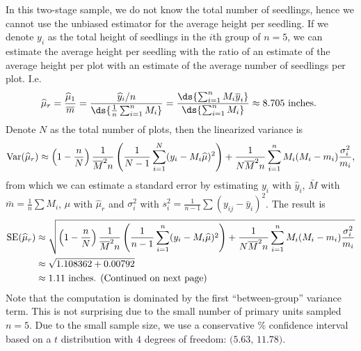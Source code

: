 \documentclass[usenames,dvipsnames]{homework}
\begin{document}
\begin{solution}
  In this two-stage sample, we do not know the total number of seedlings, hence
  we cannot use the unbiased estimator for the average height per seedling.  
  If we denote $y_i$ as the total height of seedlings in the $i$th group of $n=5$, 
  we can estimate the average height per seedling with the ratio of an estimate of the average height per plot with an estimate of 
  the average number of seedlings per plot. I.e. 
  $$
    \hat\mu_r = \frac{\hat\mu_1}{\bar m} = \frac{\hat y_i/n}{\ds{\frac 1n\sum_{i=1}^n M_i }} = \frac{\ds{\sum_{i=1}^n M_i\bar y_i }}{\ds{\sum_{i=1}^n M_i }} \approx 8.705\text{ inches. }
  $$
  Denote $N$ as the total number of plots, then the linearized variance is
  $$
    \mathrm{Var}(\widehat\mu_r) \approx \left(1-\frac nN\right) \frac 1{\overline M^2n} \left(\frac 1{N-1} \sum_{i=1}^N(y_i - M_i\widehat\mu)^2\right) + \frac{1}{N\overline M^2n} \sum_{i=1}^n M_i (M_i - m_i) \frac{\sigma_i^2}{m_i},
  $$
  from which we can estimate a standard error by estimating $y_i$ with $\hat y_i$, $\bar M$ with $\bar m = \frac 1n\sum M_i$, $\mu$ with $\hat\mu_r$ and $\sigma_i^2$ with $s_i^2 = \frac{1}{n-1}\sum (y_{ij} - \bar y_i)^2$. The result is
  \begin{align*}
    \mathrm{SE}(\widehat\mu_r) 
    &\approx \sqrt{\left(1-\frac nN\right) \frac 1{\overline M^2n} \left(\frac 1{n-1} \sum_{i=1}^n(y_i - M_i\widehat\mu)^2\right) + \frac{1}{N\overline M^2n} \sum_{i=1}^n M_i (M_i - m_i) \frac{\sigma_i^2}{m_i}} \\
     &\approx \sqrt{1.108362 + 0.00792}\\
     &\approx 1.11\text{ inches. (Continued on next page)}
  \end{align*}
  \newpage
  Note that the computation is dominated by the first ``between-group'' variance term.  This is not surprising due to the small number of primary units sampled $n=5$.  
  Due to the small sample size, we use a conservative \unit[95]{\%} confidence interval based on a $t$ distribution with $4$ degrees of freedom: $\big(5.63,\, 11.78 \big)$. 
  \vspace{-2em}
\end{solution}
\end{document}
